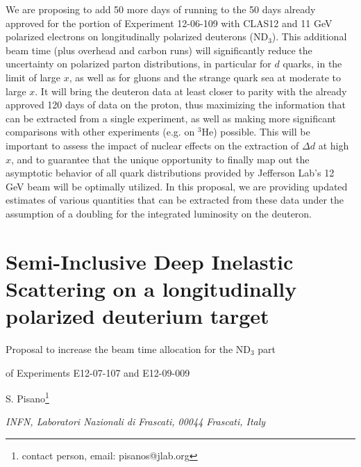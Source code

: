 \documentclass[a4paper,12pt]{report}
\begin{document}
\abstract
{We are proposing to add 50 more days of running to the 50 days already approved for the portion of Experiment 12-06-109 with CLAS12 and 11 GeV polarized electrons on longitudinally polarized deuterons (ND$_3$). This additional beam time (plus overhead and carbon runs) will significantly reduce the uncertainty on polarized parton distributions, in particular for $d$ quarks, in the limit of large $x$, as well as for gluons and the strange quark sea at moderate to large $x$. It will bring the deuteron data at least closer to parity with the already approved 120 days of data on the proton, thus maximizing the information that can be extracted from a single experiment, as well as making more significant comparisons with other experiments (e.g. on $^3$He) possible. This will be important to assess the impact of nuclear effects on the extraction of $\Delta d$ at high $x$, and to guarantee that the unique opportunity to finally map out the asymptotic behavior of all quark distributions provided by Jefferson Lab's 12 GeV beam will be optimally utilized. In this proposal, we are providing updated estimates of various quantities that can be extracted from these data under the assumption of a doubling for the integrated luminosity on the deuteron.
}
\newpage
\setcounter{page}{72}

\newpage
\chapter{Semi-Inclusive Deep Inelastic Scattering on a longitudinally polarized deuterium target}
\centerline{Proposal to increase the beam time allocation for the ND$_3$ part}
\centerline{of Experiments E12-07-107 and E12-09-009}
\vskip 0.4cm
\centerline{S. Pisano\footnote{contact person, email: pisanos@jlab.org}}
\centerline{\it INFN, Laboratori Nazionali di Frascati, 00044 Frascati, Italy}
\end{document}

